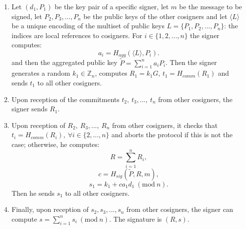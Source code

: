 \begin{enumerate}
	\item Let $(d_1, P_1)$ be the key pair of a specific signer, let $m$ be the message to be signed, let $P_2, P_3, ..., P_n$ be the public keys of the other cosigners and let $\langle L \rangle$ be a unique encoding of the multiset of public keys $L = \{P_1, P_2, ..., P_n\}$: the indices are local references to cosigners. For $i \in \{1, 2,..., n\}$ the signer computes: 
	$$a_i = H_{agg}(\langle L \rangle, P_i).$$
	and then the aggregated public key $\tilde{P} = \sum_{i = 1}^{n}a_iP_i$. Then the signer generates a random $k_1 \in \mathbb{Z}_n$, computes $R_1 = k_1G$, $t_1 = H_{comm}(R_1)$ and sends $t_1$ to all other cosigners.
	\item Upon reception of the commitments $t_2, \ t_3, ..., \ t_n$ from other cosigners, the signer sends $R_1$. 
	\item Upon reception of $R_2, \ R_3, ..., \ R_n$ from other cosigners, it checks that $t_i = H_{comm}(R_i), \ \forall i \in \{2, ..., n\}$ and aborts the protocol if this is not the case; otherwise, he computes:
	$$R = \sum_{i = 1}^{n}R_i,$$
	$$c = H_{sig}(\tilde{P}, R, m),$$
	$$s_1 = k_1 + ca_1d_1 \ (\text{mod} \ n).$$
	Then he sends $s_1$ to all other cosigners.
	\item Finally, upon reception of $s_2, s_3, ..., s_n$ from other cosigners, the signer can compute $s = \sum_{i = 1}^{n}s_i \ (\text{mod} \ n)$. The signature is $(R, s)$.
\end{enumerate}

